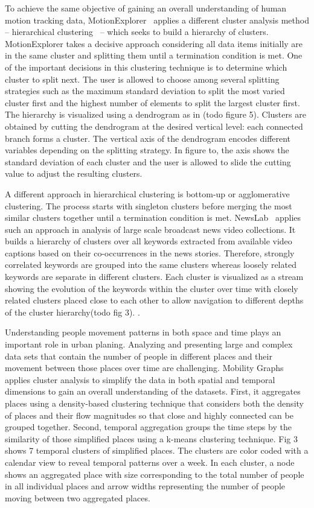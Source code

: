 To achieve the same objective of gaining an overall understanding of human motion tracking data, MotionExplorer~\cite{Bernard2013} applies a different cluster analysis method -- hierarchical clustering~\cite{Han2011} -- which seeks to build a hierarchy of clusters. MotionExplorer takes a decisive approach considering all data items initially are in the same cluster and splitting them until a termination condition is met. One of the important decisions in this clustering technique is to determine which cluster to split next. The user is allowed to choose among several splitting strategies such as the maximum standard deviation to split the most varied cluster first and the highest number of elements to split the largest cluster first. The hierarchy is visualized using a dendrogram as in (todo figure 5). Clusters are obtained by cutting the dendrogram at the desired vertical level: each connected branch forms a cluster. The vertical axis of the dendrogram encodes different variables depending on the splitting strategy. In figure to, the axis shows the standard deviation of each cluster and the user is allowed to slide the cutting value to adjust the resulting clusters.

A different approach in hierarchical clustering is bottom-up or agglomerative clustering. The process starts with singleton clusters before merging the most similar clusters together until a termination condition is met. NewsLab~\cite{Ghoniem2007} applies such an approach in analysis of large scale broadcast news video collections. It builds a hierarchy of clusters over all keywords extracted from available video captions based on their co-occurrences in the news stories. Therefore, strongly correlated keywords are grouped into the same clusters whereas loosely related keywords are separate in different clusters. Each cluster is visualized as a stream showing the evolution of the keywords within the cluster over time with closely related clusters placed close to each other to allow navigation to different depths of the cluster hierarchy(todo fig 3). .

Understanding people movement patterns in both space and time plays an important role in urban planing. Analyzing and presenting large and complex data sets that contain the number of people in different places and their movement between those places over time are challenging. Mobility Graphs~\cite{Landesberger2016} applies cluster analysis to simplify the data in both spatial and temporal dimensions to gain an overall understanding of the datasets. First, it aggregates places using a density-based clustering technique that considers both the density of places and their flow magnitudes so that close and highly connected can be grouped together. Second, temporal aggregation groups the time steps by the similarity of those simplified places using a k-means clustering technique. Fig 3 shows 7 temporal clusters of simplified places. The clusters are color coded with a calendar view to reveal temporal patterns over a week. In each cluster, a node shows an aggregated place with size corresponding to the total number of people in all individual places and arrow widths representing the number of people moving between two aggregated places.

